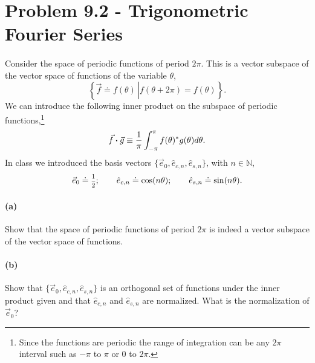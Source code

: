 \documentclass{article}
\begin{document}
\section*{Problem 9.2 - Trigonometric Fourier Series}

\paragraph{}
Consider the space of periodic functions of period $2\pi$.   This is a vector subspace of the vector space of functions of the variable $\theta$,
	\begin{equation*}
		\left.\left\{\vec{f}\doteq f(\theta)\,\right|f(\theta+2\pi)=f(\theta)\right\}.
	\end{equation*}
We can introduce the following inner product on the subspace of periodic functions,\footnote{Since the functions are periodic the range of integration can be
any $2\pi$ interval such as $-\pi$ to $\pi$ or $0$ to $2\pi$.}
	\begin{equation*}
		\vec{f}\boldsymbol{\cdot}\vec{g} \equiv \frac{1}{\pi}\int_{-\pi}^{\pi} f(\theta)^{*}g(\theta)d\theta.
	\end{equation*}
In class we introduced the basis vectors $\{\vec{e}_{0},\hat{e}_{c,n},\hat{e}_{s,n}\}$, with $n\in\mathbb{N}$,
	\begin{equation*}
		\vec{e}_{0} \doteq \fracsm{1}{2};	\qquad 	\hat{e}_{c,n} \doteq \cos(n\theta);	\qquad 	\hat{e}_{s,n} \doteq \sin(n\theta).
	\end{equation*}

\paragraph{(a)}		\extrapart
Show that the space of periodic functions of period $2\pi$ is indeed a vector subspace of the vector space of functions.


\paragraph{(b)}		
Show that $\{\vec{e}_{0},\hat{e}_{c,n},\hat{e}_{s,n}\}$ is an orthogonal set of functions under the inner product given and that 
$\hat{e}_{c,n}$ and $\hat{e}_{s,n}$ are normalized.  What is the normalization of $\vec{e}_{0}$?
\end{document}
